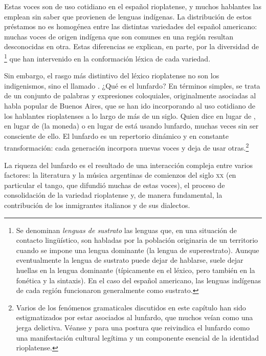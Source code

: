 Estas voces son de uso cotidiano en el español rioplatense, y muchos hablantes
las emplean sin saber que provienen de lenguas indígenas. La distribución de
estos préstamos no es homogénea entre las distintas variedades del español
americano: muchas voces de origen indígena que son comunes en una región resultan
desconocidas en otra. Estas diferencias se explican, en parte, por la diversidad
de \footnote{Se denominan \textit{lenguas de
sustrato} las lenguas que, en una situación de contacto lingüístico, son habladas
por la población originaria de un territorio cuando se impone una lengua
dominante (la lengua de superestrato). Aunque eventualmente la lengua de sustrato
puede dejar de hablarse, suele dejar huellas en la lengua dominante (típicamente
en el léxico, pero también en la fonética y la sintaxis). En el caso del español
americano, las lenguas indígenas de cada región funcionaron generalmente como
sustrato.} que han intervenido en la conformación léxica de cada variedad.

Sin embargo, el rasgo más distintivo del léxico rioplatense no son los
indigenismos, sino el llamado . ¿Qué es el lunfardo? En términos
simples, se trata de un conjunto de palabras y expresiones coloquiales,
originalmente asociadas al habla popular de Buenos Aires, que se han ido
incorporando al uso cotidiano de los hablantes rioplatenses a lo largo de más de
un siglo. Quien dice  en lugar de ,  en
lugar de  (la moneda) o  en lugar de 
está usando lunfardo, muchas veces sin ser consciente de ello. El lunfardo es un
repertorio dinámico y en constante transformación: cada generación incorpora
nuevas voces y deja de usar otras.\footnote{Varios de los fenómenos gramaticales
discutidos en este capítulo han sido estigmatizados por estar asociados al
lunfardo, que muchos veían como una jerga delictiva. Véanse
\textcite{gobello2001} y \textcite{conde2009} para una postura que reivindica el
lunfardo como una manifestación cultural legítima y un componente esencial de la
identidad rioplatense.}

La riqueza del lunfardo es el resultado de una interacción compleja entre varios
factores: la literatura y la música argentinas de comienzos del siglo
\textsc{xx} (en particular el tango, que difundió muchas de estas voces), el
proceso de consolidación de la variedad rioplatense y, de manera fundamental, la
contribución de los inmigrantes italianos y de sus dialectos.

